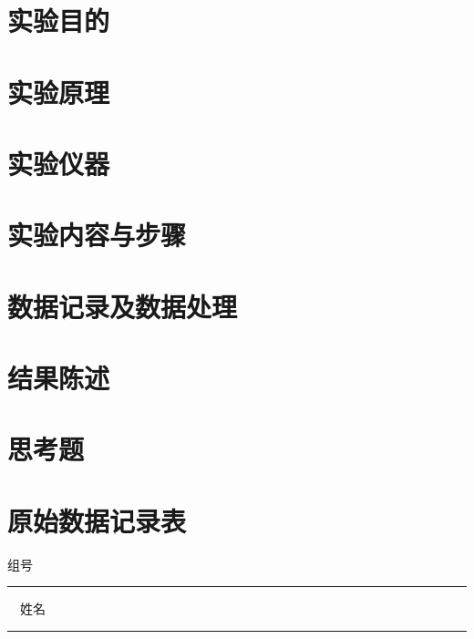 \documentclass[a4paper,zihao=5,UTF8,fontset=fandol]{phyreport}
\begin{document}
\phyExpCover


\fancypage{\fbox}{} %

\section{实验目的}

\smartLongLine
\section{实验原理}

\smartLongLine
\section{实验仪器}

\smartLongLine
\section{实验内容与步骤}

\smartLongLine
\section{数据记录及数据处理}

\smartLongLine
\section{结果陈述}

\smartLongLine
\section{思考题}

\endBox


\newpage
\thispagestyle{empty}

\fancypage{ }{}
\section*{原始数据记录表}

\noindent 组号 \rule[-5pt]{2cm}{0.4pt} \ \ 姓名 \rule[-5pt]{2cm}{0.4pt}
\end{document}
